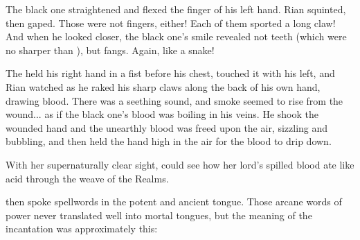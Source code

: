 The black one straightened and flexed the finger of his left hand. 
Rian squinted, then gaped. 
Those were not \scathaese{} fingers, either! Each of them sported a long claw! 
And when he looked closer, the black one's smile revealed not \scathaese{} teeth (which were no sharper than \psp{\humans}), but fangs.
Again, like a snake! 


The \scatha{} held his right hand in a fist before his chest, touched it with his left, and Rian watched as he raked his sharp claws along the back of his own hand, drawing blood. There was a seething sound, and smoke seemed to rise from the wound... as if the black one's blood was boiling in his veins. He shook the wounded hand and the unearthly blood was freed upon the air, sizzling and bubbling, and then held the hand high in the air for the blood to drip down. 







\begin{comment}
\subsubsection{\Criseis}
\end{comment}
\new
\index{\xzaishann}%
\index{\shaeeroth}%
With her supernaturally clear sight, \Criseis{} could see how her lord's spilled blood ate like acid through the weave of the Realms. 

\QuessanthIshnaruchaefir{} then spoke spellwords in the potent and ancient  tongue. Those arcane words of power never translated well into mortal tongues, but the meaning of the incantation was approximately this: 

\index{\Rystessakhin}
\index{\AeocrithRystessakhin}
\index{\ophidian}

